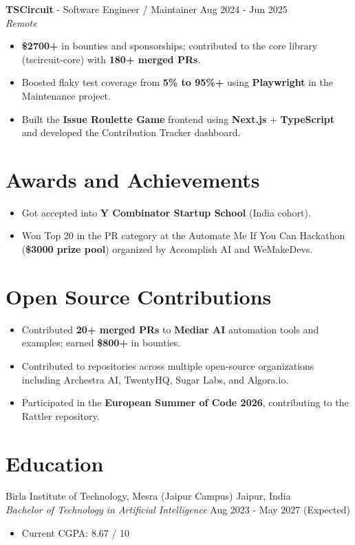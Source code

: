 \documentclass[letterpaper,10pt]{article}
\begin{document}
\vspace{2pt}

{\bfseries TSCircuit} - Software Engineer / Maintainer \hfill Aug 2024 - Jun 2025 \\
\textit{Remote}
\begin{itemize}
    \item \textbf{\$2700+} in bounties and sponsorships; contributed to the core library (tscircuit-core) with \textbf{180+ merged PRs}.
    \item Boosted flaky test coverage from \textbf{5\% to 95\%+} using \textbf{Playwright} in the Maintenance project.
    \item Built the \textbf{Issue Roulette Game} frontend using \textbf{Next.js} + \textbf{TypeScript} and developed the Contribution Tracker dashboard.
\end{itemize}


\section{Awards and Achievements}
\begin{itemize}
    \item Got accepted into \textbf{Y Combinator Startup School} (India cohort).
    \item Won Top 20 in the PR category at the Automate Me If You Can Hackathon (\textbf{\$3000 prize pool}) organized by Accomplish AI and WeMakeDevs.
\end{itemize}


\section{Open Source Contributions}
\begin{itemize}
    \item Contributed \textbf{20+ merged PRs} to \textbf{Mediar AI} automation tools and examples; earned \textbf{\$800+} in bounties.
    \item Contributed to repositories across multiple open-source organizations including Archestra AI, TwentyHQ, Sugar Labs, and Algora.io.
    \item Participated in the \textbf{European Summer of Code 2026}, contributing to the Rattler repository.
\end{itemize}


\section{Education}
Birla Institute of Technology, Mesra (Jaipur Campus) \hfill Jaipur, India \\
\textit{Bachelor of Technology in Artificial Intelligence} \hfill Aug 2023 - May 2027 (Expected)
\begin{itemize}
    \item Current CGPA: 8.67 / 10
\end{itemize}
\end{document}
